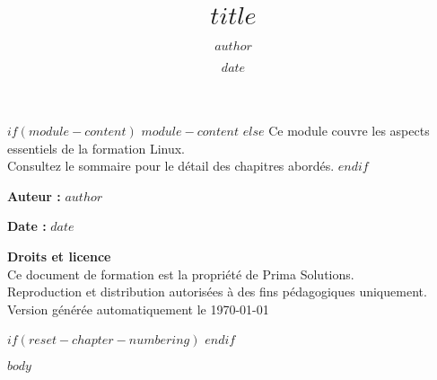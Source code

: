\documentclass[a4paper,11pt]{article}
\title{$title$}
\author{$author$}
\date{$date$}
\newcommand{\cartouchedroits}{
    \vfill
    \begin{tcolorbox}[colback=gray!5!white,colframe=gray!50!black,boxrule=1pt]
        \small
        \textbf{Droits et licence}\\
        Ce document de formation est la propriété de Prima Solutions.\\
        Reproduction et distribution autorisées à des fins pédagogiques uniquement.\\
        Version générée automatiquement le \today
    \end{tcolorbox}
}
\begin{document}

\begin{titlepage}
    \centering
    
    \begin{tcolorbox}[
        colback=modulecolor!15!white,
        colframe=modulecolor,
        boxrule=3pt,
        width=0.9\textwidth
    ]
        \centering
        {\Huge\bfseries\color{modulecolor}{$title$}}
    \end{tcolorbox}
    
    \vspace{1cm}
    
    \begin{moduleintro}
        $if(module-content)$
        $module-content$
        $else$
        Ce module couvre les aspects essentiels de la formation Linux.\\
        Consultez le sommaire pour le détail des chapitres abordés.
        $endif$
    \end{moduleintro}
    
    \vspace{2cm}
    
    {\large\textbf{Auteur :} $author$\par}
    \vspace{0.5cm}
    {\large\textbf{Date :} $date$\par}
    
    \cartouchedroits
\end{titlepage}

\newpage
\tableofcontents
\newpage

\setcounter{page}{1}

$if(reset-chapter-numbering)$
\setcounter{section}{0}
$endif$

$body$
\end{document}
